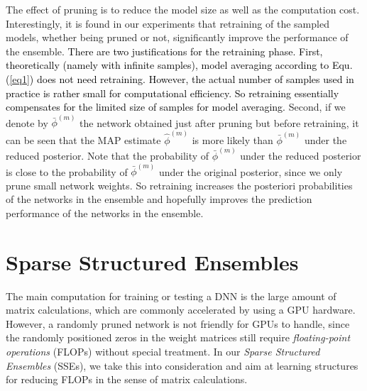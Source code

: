 \documentclass{article} %
\newcommand{\ozj}{\textcolor{black}}
\begin{document}
The effect of pruning is to reduce the model size as well as the computation cost.
Interestingly, it is found in our experiments that retraining of the sampled models, whether being pruned or not, significantly improve the performance of the ensemble.
\ozj{There are two justifications for the retraining phase.
First, theoretically (namely with infinite samples), model averaging according to Equ. (\ref{eq1}) does not need retraining.
However, the actual number of samples used in practice is rather small for computational efficiency.
So retraining essentially compensates for the limited size of samples for model averaging.}
Second, if we denote by $\bar{\phi}^{(m)}$ the network obtained  just after pruning but before retraining, it can be seen that the MAP estimate $\hat{\phi}^{(m)}$ is more likely than $\bar{\phi}^{(m)}$ under the reduced posterior.
Note that the probability of $\bar{\phi}^{(m)}$ under the reduced posterior is close to the probability of $\bar{\phi}^{(m)}$ under the original posterior, since we only prune small network weights.
So retraining increases the posteriori probabilities of the networks in the ensemble and hopefully improves the prediction performance of the networks in the ensemble.

\section{Sparse Structured Ensembles}
\label{SSE}
The main computation for training or testing a DNN is the large amount of matrix calculations, which are commonly accelerated by using a GPU hardware. However, a randomly pruned network is not friendly for GPUs to handle, since the randomly positioned zeros in the weight matrices still require \textit{floating-point operations} (FLOPs) without special treatment. In our \textit{Sparse Structured Ensembles} (SSEs), we take this into consideration and aim at learning structures for reducing FLOPs in the sense of matrix calculations.
\end{document}

